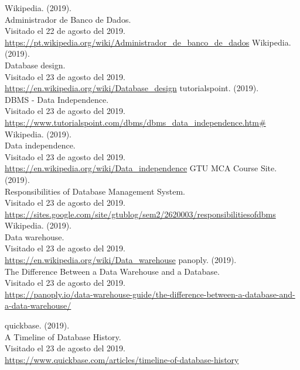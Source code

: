 \documentclass[a4paper, 12pt]{report}
\begin{document}
\begin{thebibliography}{20}
        Wikipedia. (2019).\\
        Administrador de Banco de Dados.\\
        Visitado el 22 de agosto del 2019.\\
        \url{https://pt.wikipedia.org/wiki/Administrador_de_banco_de_dados}
        Wikipedia. (2019).\\
        Database design.\\
        Visitado el 23 de agosto del 2019.\\
        \url{https://en.wikipedia.org/wiki/Database_design}
        tutorialspoint. (2019).\\
        DBMS - Data Independence.\\
        Visitado el 23 de agosto del 2019.\\
        \url{https://www.tutorialspoint.com/dbms/dbms_data_independence.htm#}
        Wikipedia. (2019).\\
        Data independence.\\
        Visitado el 23 de agosto del 2019.\\
        \url{https://en.wikipedia.org/wiki/Data_independence}
        GTU MCA Course Site. (2019).\\
        Responsibilities of Database Management System.\\
        Visitado el 23 de agosto del 2019.\\
        \url{https://sites.google.com/site/gtublog/sem2/2620003/responsibilitiesofdbms}
        Wikipedia. (2019).\\
        Data warehouse.\\
        Visitado el 23 de agosto del 2019.\\
        \url{https://en.wikipedia.org/wiki/Data_warehouse}
        panoply. (2019).\\
        The Difference Between a Data Warehouse and a Database.\\
        Visitado el 23 de agosto del 2019.\\
        \url{https://panoply.io/data-warehouse-guide/the-difference-between-a-database-and-a-data-warehouse/}

        quickbase. (2019).\\
        A Timeline of Database History.\\
        Visitado el 23 de agosto del 2019.\\
        \url{https://www.quickbase.com/articles/timeline-of-database-history}

\end{thebibliography}
\end{document}
